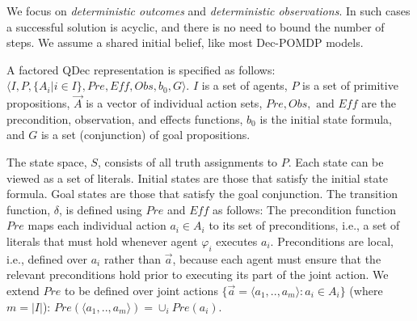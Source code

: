 \documentclass[letterpaper]{article} %
\theoremstyle{definition}
\begin{document}
We focus on {\em deterministic outcomes} and {\em deterministic observations}. In such cases a successful solution is acyclic, and there is no need to bound the number of steps. 
We assume a shared initial belief, like most Dec-POMDP models.

A factored QDec representation is specified as follows: $\langle I,P,\{A_i | i\in I\},\mathit{Pre},\mathit{Eff},\mathit{Obs},b_0,G\rangle$. $I$ is a set of agents, $P$ is a set of primitive propositions, $\vec{A}$ is a vector of individual action sets,  $\mathit{Pre, Obs,} \text{ and } \mathit{Eff}$ are the precondition, observation, and effects functions,
$b_0$ is the initial state formula, and $G$ is a set (conjunction) of goal propositions.


The state space, $S$, consists of all truth assignments to $P$. Each state can be viewed as a set of literals. Initial states are those that satisfy the initial state formula. Goal states are those that satisfy the goal conjunction.
%
The transition function,
$\delta$, is defined using  $\mathit{Pre}$ and  $\mathit{Eff}$ as follows:
The precondition function $\mathit{Pre}$ maps each individual action $a_i\in A_i$ to its set of preconditions, i.e., a set of literals that must
hold whenever agent $\varphi_i$ executes $a_i$. Preconditions are local, i.e., defined over $a_i$ rather than $\vec{a}$, because each agent must ensure that the relevant preconditions hold prior to executing its part of the joint action. We extend $\mathit{Pre}$ to be defined over joint actions $\{\vec{a}=\langle a_1,..,a_m\rangle : a_i \in A_i\}$ (where $m=|I|$):
$\mathit{Pre}(\langle a_1,..,a_m\rangle) = \cup_i \mathit{Pre}(a_i)$.
\end{document}
